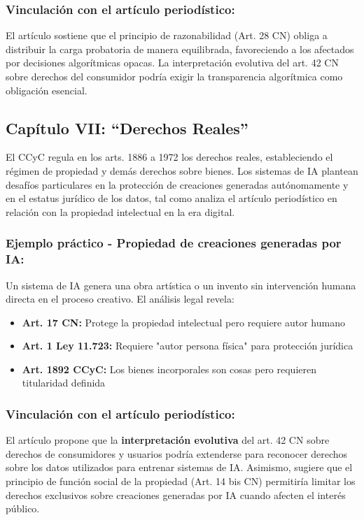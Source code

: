\documentclass[10pt, a4paper]{article}
\begin{document}
\subsubsection*{Vinculación con el artículo periodístico:}
El artículo sostiene que el principio de razonabilidad (Art. 28 CN) obliga a distribuir la carga probatoria de manera equilibrada, favoreciendo a los afectados por decisiones algorítmicas opacas. La interpretación evolutiva del art. 42 CN sobre derechos del consumidor podría exigir la transparencia algorítmica como obligación esencial.

\subsection{Capítulo VII: ``Derechos Reales''}
\label{subsec:derechos_reales}

El CCyC regula en los arts. 1886 a 1972 los derechos reales, estableciendo el régimen de propiedad y demás derechos sobre bienes. Los sistemas de IA plantean desafíos particulares en la protección de creaciones generadas autónomamente y en el estatus jurídico de los datos, tal como analiza el artículo periodístico en relación con la propiedad intelectual en la era digital.

\subsubsection*{Ejemplo práctico - Propiedad de creaciones generadas por IA:}
Un sistema de IA genera una obra artística o un invento sin intervención humana directa en el proceso creativo. El análisis legal revela:

\begin{itemize}
    \item \textbf{Art. 17 CN:} Protege la propiedad intelectual pero requiere autor humano
    \item \textbf{Art. 1 Ley 11.723:} Requiere "autor persona física" para protección jurídica
    \item \textbf{Art. 1892 CCyC:} Los bienes incorporales son cosas pero requieren titularidad definida
\end{itemize}

\subsubsection*{Vinculación con el artículo periodístico:}
El artículo propone que la \textbf{interpretación evolutiva} del art. 42 CN sobre derechos de consumidores y usuarios podría extenderse para reconocer derechos sobre los datos utilizados para entrenar sistemas de IA. Asimismo, sugiere que el principio de función social de la propiedad (Art. 14 bis CN) permitiría limitar los derechos exclusivos sobre creaciones generadas por IA cuando afecten el interés público.
\end{document}

